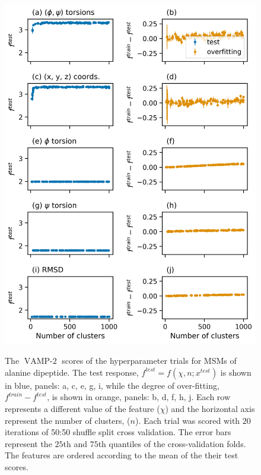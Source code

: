 \begin{figure}[h!]
    \centering
    \caption{The $\operatorname{VAMP-2}$ scores of the hyperparameter trials for MSMs of alanine dipeptide. The test response, $f^{test} = f(\chi, n; x^{test})$ is shown in blue, panels: a, c, e, g, i,  while the degree of over-fitting, $f^{train} - f^{test}$, is shown in orange, panels: b, d, f, h, j. Each row represents a different value of the feature ($\chi$) and the horizontal axis represent the number of clusters, ($n$). Each trial was scored with $20$ iterations of 50:50 shuffle split cross validation. The error bars represent the $25$th and $75$th quantiles of the cross-validation folds. 
    The features are ordered according to the mean of the their test scores.}
    \includegraphics[height=0.8\textheight]{chapters/msm_optimization/figures/ala1_train_test_results.png}
    \label{fig:ala1_train_test}
\end{figure}

